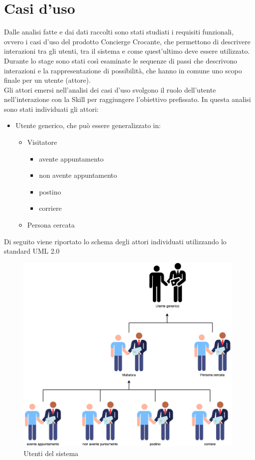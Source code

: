 \section{Casi d'uso}
Dalle analisi fatte e dai dati raccolti sono stati studiati i requisiti funzionali, ovvero i casi d'uso del prodotto Concierge Crocante, che permettono di descrivere interazioni tra gli utenti, tra il sistema e come quest'ultimo deve essere utilizzato. Durante lo stage sono stati così esaminate le sequenze di passi che descrivono interazioni e la rappresentazione di possibilità, che hanno in comune uno scopo finale per un utente (attore).\\[0.4cm]
Gli attori emersi nell'analisi dei casi d’uso svolgono il ruolo dell'utente nell'interazione con la Skill per raggiungere l’obiettivo prefissato. In questa analisi sono stati individuati gli attori:
    \begin{itemize}
        \item Utente generico, che può essere generalizzato in:
            \begin{itemize}
                \item Visitatore
                    \begin{itemize}
                        \item avente appuntamento
                        \item non avente appuntamento
                        \item postino
                        \item corriere
                    \end{itemize}
                \item Persona cercata
        \end{itemize}
    \end{itemize}
Di seguito viene riportato lo schema degli attori individuati utilizzando lo standard UML 2.0
\begin{figure}[H] 
    \centering 
    \includegraphics[width=0.9\columnwidth]{immagini/attori.png}
    \caption{\label{fig:attori}Utenti del sistema}
\end{figure}
